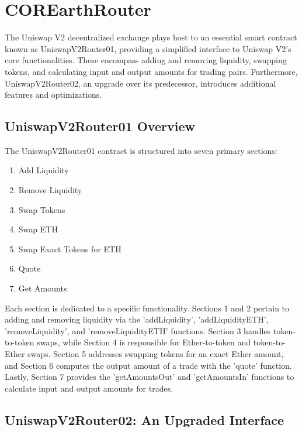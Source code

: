 \documentclass[sigconf, authordraft]{acmart}
\begin{document}
	\section{COREarthRouter}


	The Uniswap V2 decentralized exchange plays host to an essential smart contract
	known as UniswapV2Router01, providing a simplified interface to Uniswap V2's
	core functionalities. These encompass adding and removing liquidity, swapping
	tokens, and calculating input and output amounts for trading pairs.
	Furthermore, UniswapV2Router02, an upgrade over its predecessor, introduces additional
	features and optimizations.

	\subsection{UniswapV2Router01 Overview}


	The UniswapV2Router01 contract is structured into seven primary sections:

	\begin{enumerate}
		\item Add Liquidity

		\item Remove Liquidity

		\item Swap Tokens

		\item Swap ETH

		\item Swap Exact Tokens for ETH

		\item Quote

		\item Get Amounts
	\end{enumerate}

	Each section is dedicated to a specific functionality. Sections 1 and 2 pertain
	to adding and removing liquidity via the 'addLiquidity', 'addLiquidityETH', 'removeLiquidity',
	and 'removeLiquidityETH' functions. Section 3 handles token-to-token swaps,
	while Section 4 is responsible for Ether-to-token and token-to-Ether swaps. Section
	5 addresses swapping tokens for an exact Ether amount, and Section 6 computes
	the output amount of a trade with the 'quote' function. Lastly, Section 7
	provides the 'getAmountsOut' and 'getAmountsIn' functions to calculate input
	and output amounts for trades.

	\subsection{UniswapV2Router02: An Upgraded Interface}
\end{document}
